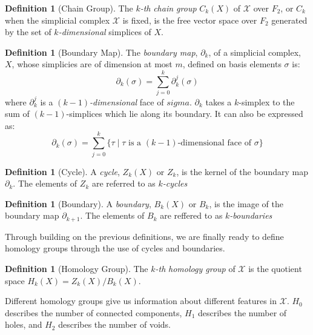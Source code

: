 \documentclass[ma]{uncgdissertationexp}
\theoremstyle{plain}
\theoremstyle{definition}
\newtheorem{definition}[theorem]{Definition}
\theoremstyle{remark}
\begin{document}
\begin{definition}[Chain Group]
\par The $k$\textit{-th} \textit{chain group} $C_k(X)$ of $\mathcal{X}$ over $F_2$, or $C_k$ when the simplicial complex $\mathcal{X}$ is fixed, is the free vector space over $F_2$ generated by the set of $k$\textit{-dimensional} simplices of $X$.
\end{definition}

\begin{definition}[Boundary Map]
\par The \textit{boundary map}, $\partial_{k}$, of a simplicial complex, $X$, whose simplicies are of dimension at most $m$, defined on basis elements $\sigma$ is:
$$\partial_{k}(\sigma)=\sum^{k}_{j=0}\partial^{j}_{k}(\sigma)$$
where $\partial^{j}_{k}$ is a $(k-1)$\textit{-dimensional} face of $sigma$. $\partial_{k}$ takes a $k$-simplex to the sum of $(k-1)$-simplices which lie along its boundary. It can also be expressed as:
$$\partial_{k}(\sigma)=\sum^{k}_{j=0}\big\{\tau \mid \tau \text{ is a }(k-1)\text{-dimensional face of } \sigma \big\}$$
\end{definition}

\begin{definition}[Cycle]
\par A \textit{cycle}, $Z_{k}(X)$ or $Z_k$, is the kernel of the boundary map $\partial_{k}$. The elements of $Z_k$ are referred to as $k$\textit{-cycles}
\end{definition}

\begin{definition}[Boundary]
\par A \textit{boundary}, $B_{k}(X)$ or $B_k$, is the image of the boundary map $\partial_{k+1}$. The elements of $B_k$ are reffered to as $k$\textit{-boundaries}
\end{definition}

\par Through building on the previous definitions, we are finally ready to define homology groups through the use of cycles and boundaries.

\begin{definition}[Homology Group]
\par The $k$\textit{-th} \textit{homology group} of $\mathcal{X}$ is the quotient space $H_k(X) = Z_{k}(X)/B_{k}(X)$.
\end{definition}

\par Different homology groups give us information about different features in $\mathcal{X}$. $H_{0}$ describes the number of connected components, $H_{1}$ describes the number of holes, and $H_{2}$ describes the number of voids.
\end{document}
